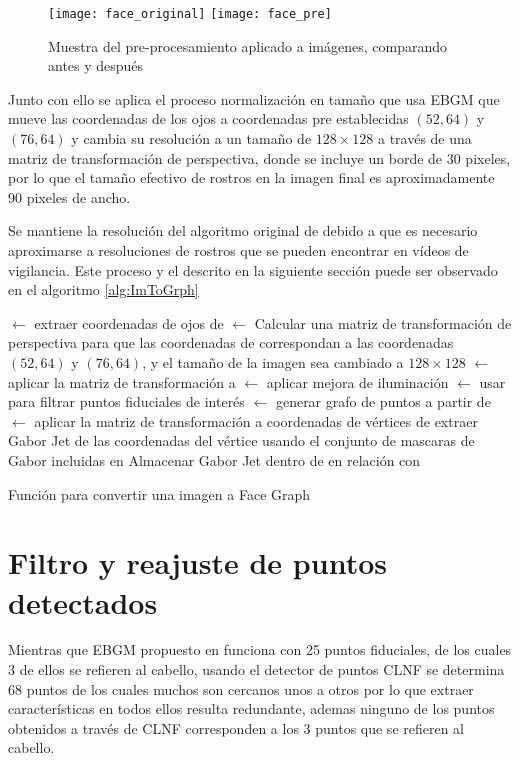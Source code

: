 \begin{figure}[h]
\center
\texttt{[image: face\_original]}
\texttt{[image: face\_pre]}
\caption{Muestra del pre-procesamiento aplicado a imágenes, comparando antes y después}
\label{im:Preprocess}
\end{figure}

Junto con ello se aplica el proceso normalización en tamaño que usa \ac{EBGM} que mueve las coordenadas de los ojos a coordenadas pre establecidas $(52, 64)$ y $(76, 64)$ y cambia su resolución a un tamaño de $128 \times 128$ a través de una matriz de transformación de  perspectiva, donde se incluye un borde de 30 pixeles, por lo que el tamaño efectivo de rostros en la imagen final es aproximadamente 90 pixeles de ancho.

Se mantiene la resolución del algoritmo original de \cite{bolme2003elastic} debido a que es necesario aproximarse a resoluciones de rostros que se pueden encontrar en vídeos de vigilancia.
Este proceso y el descrito en la siguiente sección puede ser observado en el algoritmo \ref{alg:ImToGrph}

\begin{algorithm}[h]
\label{alg:ImToGrph}
\;
{
 $\gets$ extraer coordenadas de ojos de \;
 $\gets$ Calcular una matriz de transformación de perspectiva para que las coordenadas de  correspondan a las coordenadas $(52,64)$ y $(76,64)$,  y el tamaño de la imagen sea cambiado a $128 \times 128$\;
 $\gets$ aplicar la matriz de transformación  a \;
 $\gets$ aplicar mejora de iluminación\;
 $\gets$ usar  para filtrar puntos fiduciales de interés\;
 $\gets$ generar grafo de puntos a partir de \;
 $\gets$ aplicar la matriz de transformación  a coordenadas de vértices de \;
{
	extraer Gabor Jet de las coordenadas del vértice usando el conjunto de mascaras de Gabor incluidas en \;
    Almacenar Gabor Jet dentro de  en relación con \;
}
\Return {}\;
}

\caption{Función para convertir una imagen a Face Graph}
\end{algorithm}

\section{Filtro y reajuste de puntos detectados}
Mientras que \ac{EBGM} propuesto en \cite{bolme2003elastic} funciona con 25 puntos fiduciales, de los cuales 3 de ellos se refieren al cabello, usando el detector de puntos \ac{CLNF} se determina 68 puntos de los cuales muchos son cercanos unos a otros por lo que extraer características en todos ellos resulta redundante, ademas ninguno de los puntos obtenidos a través de \ac{CLNF} corresponden a los 3 puntos que se refieren al cabello.

